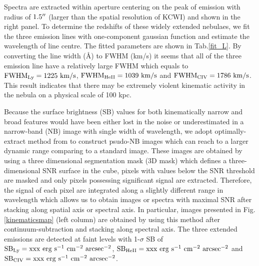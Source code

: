 Spectra are extracted within aperture centering on the peak of emission with radius of $1.5\mbox{$^{\prime\prime}$}$ (larger than the spatial resolution of KCWI) and shown in the right panel. To determine the redshifts of these widely extended nebulaes, we fit the three emission lines with one-component gaussian function and estimate the wavelength of line centre. The fitted parameters are shown in Tab.\ref{fit_L}. By converting the line width (\AA) to FWHM (km/s) it seems that all of the three emission line have a relatively large FWHM which equals to $\rm FWHM_{Ly}=1225 \ km/s$, $\rm FWHM_{HeII}=1039 \ km/s$ and $\rm FWHM_{CIV}=1786 \ km/s$. This result indicates that there may be extremely violent kinematic activity in the nebula on a physical scale of 100 kpc.

Because the surface brightness (SB) values for both kinematically narrow and broad features would have been either lost in the noise or underestimated in a narrow-band (NB) image with single width of wavelength, we adopt optimally-extract method from \citet{borisova2016ubiquitous} to construct psudo-NB images which can reach to a larger dynamic range comparing to a standard image. These images are obtained by using a three dimensional segmentation mask (3D mask) which defines a three-dimensional SNR surface in the cube, pixels with values below the SNR threshold are masked and only pixels possessing significant signal are extracted. Therefore, the signal of each pixel are integrated along a slightly different range in wavelength which allows us to obtain images or spectra with maximal SNR after stacking along spatial axis or spectral axis. In particular, images presented in Fig. \ref{kinematicsmap} (left column) are obtained by using this method after continuum-subtraction and stacking along spectral axis. The three extended emissions are detected at faint levels with 1-$\sigma$ SB of $\rm SB_{Ly}=xxx \ erg \ s^{-1} \ cm^{-2} \ arcsec^{-2}$, $\rm SB_{HeII}=xxx \ erg \ s^{-1} \ cm^{-2} \ arcsec^{-2}$ and $\rm SB_{CIV}=xxx \ erg \ s^{-1} \ cm^{-2} \ arcsec^{-2}$. 


